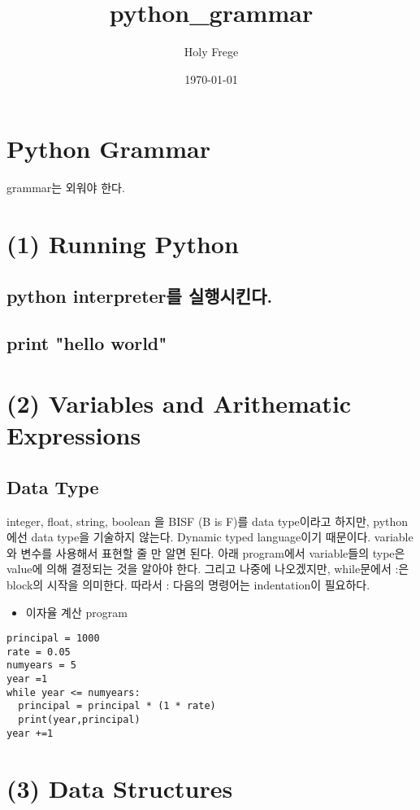 \documentclass[11pt]{article}
\author{Holy Frege}
\date{\today}
\title{python\_grammar}
\begin{document}
\maketitle
\tableofcontents


\section{Python Grammar}
\label{sec:orgdd7df95}
\begin{note}
grammar는 외워야 한다.
\end{note}
\section{(1) Running Python}
\label{sec:org36f0137}
\subsection{python interpreter를 실행시킨다.}
\label{sec:orga3302ee}
\subsection{print "hello world"}
\label{sec:orge6d9ba2}
\section{(2) Variables and Arithematic Expressions}
\label{sec:orgbf04a1e}
\subsection{Data Type}
\label{sec:org7c450a0}
\begin{note}
integer, float, string, boolean 을 BISF (B is F)를 data type이라고 하지만, python에선 data type을 기술하지 않는다.  Dynamic typed language이기 때문이다. variable와 변수를 사용해서 표현할 줄 만 알면 된다. 아래 program에서 variable들의 type은 value에 의해 결정되는 것을 알아야 한다. 그리고 나중에 나오겠지만, while문에서 :은 block의 시작을 의미한다. 따라서 : 다음의 명령어는 indentation이 필요하다.
\end{note}
\begin{itemize}
\item 이자율 계산 program
\end{itemize}
\begin{verbatim}
principal = 1000
rate = 0.05
numyears = 5
year =1
while year <= numyears:
  principal = principal * (1 * rate)
  print(year,principal)
year +=1
\end{verbatim}
\section{(3) Data Structures}
\label{sec:org4a61cd4}
\end{document}
